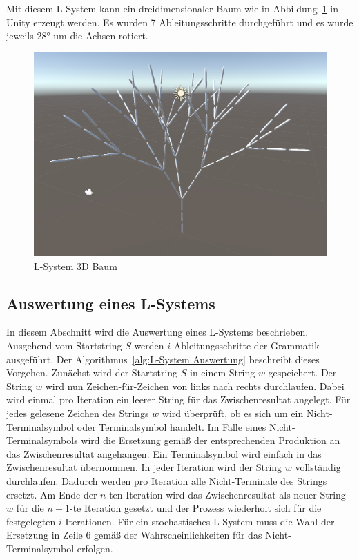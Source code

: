 Mit diesem L-System kann ein dreidimensionaler Baum wie in Abbildung~\ref{fig:L-System 3D Unity} in Unity erzeugt werden.
Es wurden 7 Ableitungsschritte durchgeführt und es wurde jeweils \ang{28} um die Achsen rotiert.

\begin{figure}[ht]
    \centering
    \includegraphics[width=0.5\linewidth]{chapters/02_Grundlagen/L_System/L_System_3D_Tree.png}
    \caption[L-System 3D Baum]{L-System 3D Baum}\label{fig:L-System 3D Unity}
\end{figure}


\subsection{Auswertung eines L-Systems}
In diesem Abschnitt wird die Auswertung eines L-Systems beschrieben.
Ausgehend vom Startstring $S$ werden $i$ Ableitungsschritte der Grammatik ausgeführt.
Der Algorithmus~\ref{alg:L-System Auswertung} beschreibt dieses Vorgehen.
Zunächst wird der Startstring $S$ in einem String $w$ gespeichert.
Der String $w$ wird nun Zeichen-für-Zeichen von links nach rechts durchlaufen.
Dabei wird einmal pro Iteration ein leerer String für das Zwischenresultat angelegt.
Für jedes gelesene Zeichen des Strings $w$ wird überprüft, ob es sich um ein Nicht-Terminalsymbol oder Terminalsymbol handelt.
Im Falle eines Nicht-Terminalsymbols wird die Ersetzung gemäß der entsprechenden Produktion an das Zwischenresultat angehangen.
Ein Terminalsymbol wird einfach in das Zwischenresultat übernommen.
In jeder Iteration wird der String $w$ vollständig durchlaufen.
Dadurch werden pro Iteration alle Nicht-Terminale des Strings ersetzt.
Am Ende der $n$-ten Iteration wird das Zwischenresultat als neuer String $w$ für die $n+1$-te Iteration gesetzt und der Prozess wiederholt sich für die festgelegten $i$ Iterationen.
Für ein stochastisches L-System muss die Wahl der Ersetzung in Zeile 6 gemäß der Wahrscheinlichkeiten für das Nicht-Terminalsymbol erfolgen.

